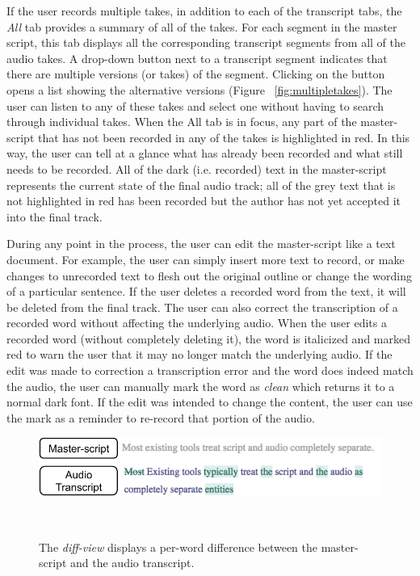 
If the user records multiple takes, in addition to each of the transcript tabs, the \textit{All} tab provides a summary of all of the takes. For each segment in the master script, this tab displays all the corresponding transcript segments from all of the audio takes. A drop-down button next to a transcript segment  indicates that there are multiple versions (or takes)  of the  segment. Clicking on the button opens a list showing the alternative versions (Figure ~\ref{fig:multipletakes}). The user can listen to any of these takes and select one without having to search through individual takes. When the All tab is in focus, any part of the master-script that has not been recorded in any of the takes is highlighted in red. In this way, the user can tell at a glance what has already been recorded and what still needs to be recorded. All of the dark (i.e. recorded) text in the master-script represents the current state of the final audio track; all of the grey text that is not highlighted in red has been recorded but the author has not yet accepted it into the final track. 

During any point in the process, the user can edit the master-script like a text document.  For example, the user can simply insert more text to record, or make changes to unrecorded text to flesh out the original outline or change the wording of a particular sentence. If the user deletes a recorded word from the text, it will be deleted from the final track. The user can also correct the transcription of a recorded word without affecting the underlying audio. When the user edits a recorded word (without completely deleting it), the word is italicized and marked red to warn the user that it may no longer match the underlying audio. If the edit was made to correction a transcription error and the word does indeed match the audio, the user can manually mark the word as \textit{clean} which returns it to a normal dark font. If the edit was intended to change the content, the user can use the mark as a reminder to re-record that portion of the audio.
\begin{figure}
\centering
  \includegraphics[width=1.0\columnwidth]{figures/diffview}
  \caption{The \textit{diff-view} displays a per-word difference between the master-script and the audio transcript. }~\label{fig:diffview}
\end{figure}

